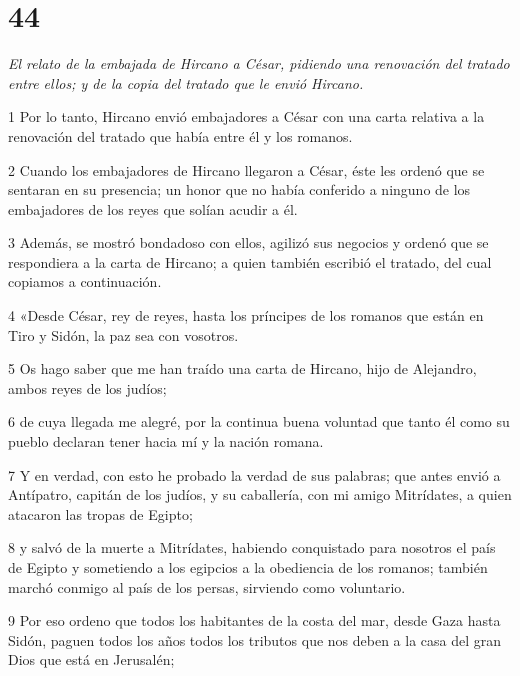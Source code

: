 \chapter{44}

\par \textit{El relato de la embajada de Hircano a César, pidiendo una renovación del tratado entre ellos; y de la copia del tratado que le envió Hircano.}

\par 1 Por lo tanto, Hircano envió embajadores a César con una carta relativa a la renovación del tratado que había entre él y los romanos.

\par 2 Cuando los embajadores de Hircano llegaron a César, éste les ordenó que se sentaran en su presencia; un honor que no había conferido a ninguno de los embajadores de los reyes que solían acudir a él.

\par 3 Además, se mostró bondadoso con ellos, agilizó sus negocios y ordenó que se respondiera a la carta de Hircano; a quien también escribió el tratado, del cual copiamos a continuación.

\par 4 «Desde César, rey de reyes, hasta los príncipes de los romanos que están en Tiro y Sidón, la paz sea con vosotros.

\par 5 Os hago saber que me han traído una carta de Hircano, hijo de Alejandro, ambos reyes de los judíos;

\par 6 de cuya llegada me alegré, por la continua buena voluntad que tanto él como su pueblo declaran tener hacia mí y la nación romana.

\par 7 Y en verdad, con esto he probado la verdad de sus palabras; que antes envió a Antípatro, capitán de los judíos, y su caballería, con mi amigo Mitrídates, a quien atacaron las tropas de Egipto;

\par 8 y salvó de la muerte a Mitrídates, habiendo conquistado para nosotros el país de Egipto y sometiendo a los egipcios a la obediencia de los romanos; también marchó conmigo al país de los persas, sirviendo como voluntario.

\par 9 Por eso ordeno que todos los habitantes de la costa del mar, desde Gaza hasta Sidón, paguen todos los años todos los tributos que nos deben a la casa del gran Dios que está en Jerusalén;

